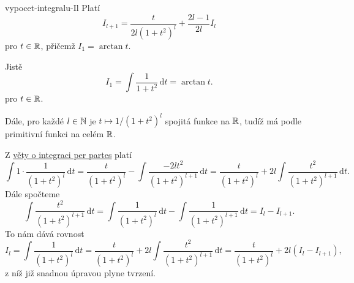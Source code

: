 \begin{lemma}{}{vypocet-integralu-Il}
 Platí
 \[
  I_{l+1} = \frac{t}{2l(1 + t^2)^{l}} + \frac{2l - 1}{2l}I_l
 \]
 pro $t \in \mathbb{R}$, přičemž $I_1 = \arctan t$.
\end{lemma}
\begin{lemproof}
 Jistě
 \[
  I_1 = \int \frac{1}{1+t^2} \, \mathrm{d}t = \arctan t.
 \]
 pro $t \in \mathbb{R}$.

 Dále, pro každé $l \in \mathbb{N}$ je $t \mapsto 1 / (1+t^2)^{l}$ spojitá funkce na
 $\mathbb{R}$, tudíž má podle 
 primitivní funkci na celém $\mathbb{R}$.
 
 Z \hyperref[thm:integrace-per-partes]{věty o integraci per partes} platí
 \[
  \int 1 \cdot \frac{1}{(1 + t^2)^{l}} \, \mathrm{d}t = \frac{t}{(1 + t^2)^{l}}
  - \int \frac{-2lt^2}{(1+t^2)^{l+1}} \, \mathrm{d}t = \frac{t}{(1 + t^2)^{l}} +
  2l \int \frac{t^2}{(1 + t^2)^{l+1}} \, \mathrm{d}t. 
 \]
 Dále spočteme
 \[
  \int \frac{t^2}{(1 + t^2)^{l+1}} \, \mathrm{d}t = \int \frac{1}{(1 + t^2)^{l}}
  \, \mathrm{d}t - \int \frac{1}{(1 + t^2)^{l+1}} \, \mathrm{d}t = I_l -
  I_{l+1}.  
 \]
 To nám dává rovnost
 \[
  I_l = \int \frac{1}{(1+t^2)^{l}} \, \mathrm{d}t = \frac{t}{(1+t^2)^{l}} + 2l
  \int \frac{t^2}{(1+t^2)^{l+1}} \, \mathrm{d}t = \frac{t}{(1 + t^2)^{l}} +
  2l(I_l - I_{l+1}),
 \]
 z níž již snadnou úpravou plyne tvrzení.
\end{lemproof}


